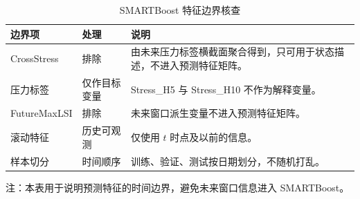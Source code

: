 \begin{table}[H]
\centering
\caption{SMARTBoost 特征边界核查}
\label{tab:smartboost-leakage}
\small
\begin{threeparttable}
\begin{tabularx}{\textwidth}{p{}p{}Y}
\toprule
边界项 & 处理 & 说明 \\
\midrule
CrossStress & 排除 & 由未来压力标签横截面聚合得到，只可用于状态描述，不进入预测特征矩阵。 \\
压力标签 & 仅作目标变量 & Stress\_H5 与 Stress\_H10 不作为解释变量。 \\
FutureMaxLSI & 排除 & 未来窗口派生变量不进入预测特征矩阵。 \\
滚动特征 & 历史可观测 & 仅使用 \(t\) 时点及以前的信息。 \\
样本切分 & 时间顺序 & 训练、验证、测试按日期划分，不随机打乱。 \\
\bottomrule
\end{tabularx}
\begin{tablenotes}[flushleft]
\footnotesize
\item 注：本表用于说明预测特征的时间边界，避免未来窗口信息进入 SMARTBoost。
\end{tablenotes}
\end{threeparttable}
\end{table}
